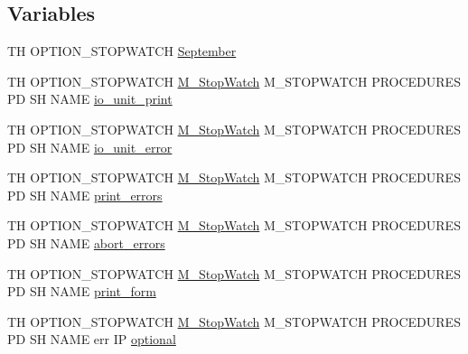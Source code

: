 \subsection*{Variables}
\begin{DoxyCompactItemize}
\item 
TH O\+P\+T\+I\+O\+N\+\_\+\+S\+T\+O\+P\+W\+A\+T\+CH \hyperlink{option__stopwatch_83_8txt_acc3d7c797b4f4947458d4eda2991d70a}{September}
\item 
TH O\+P\+T\+I\+O\+N\+\_\+\+S\+T\+O\+P\+W\+A\+T\+CH \hyperlink{option__stopwatch_83_8txt_aa2011fc45a5e502e87ee50996a8a9305}{M\+\_\+\+Stop\+Watch} M\+\_\+\+S\+T\+O\+P\+W\+A\+T\+CH P\+R\+O\+C\+E\+D\+U\+R\+ES PD SH N\+A\+ME \hyperlink{option__stopwatch_83_8txt_a4fe5427ea57805c6d78b77a54a002e36}{io\+\_\+unit\+\_\+print}
\item 
TH O\+P\+T\+I\+O\+N\+\_\+\+S\+T\+O\+P\+W\+A\+T\+CH \hyperlink{option__stopwatch_83_8txt_aa2011fc45a5e502e87ee50996a8a9305}{M\+\_\+\+Stop\+Watch} M\+\_\+\+S\+T\+O\+P\+W\+A\+T\+CH P\+R\+O\+C\+E\+D\+U\+R\+ES PD SH N\+A\+ME \hyperlink{option__stopwatch_83_8txt_a5921418297454465f26a02b350456a4b}{io\+\_\+unit\+\_\+error}
\item 
TH O\+P\+T\+I\+O\+N\+\_\+\+S\+T\+O\+P\+W\+A\+T\+CH \hyperlink{option__stopwatch_83_8txt_aa2011fc45a5e502e87ee50996a8a9305}{M\+\_\+\+Stop\+Watch} M\+\_\+\+S\+T\+O\+P\+W\+A\+T\+CH P\+R\+O\+C\+E\+D\+U\+R\+ES PD SH N\+A\+ME \hyperlink{option__stopwatch_83_8txt_aac742f39d25b161bfa9ac83be8041e45}{print\+\_\+errors}
\item 
TH O\+P\+T\+I\+O\+N\+\_\+\+S\+T\+O\+P\+W\+A\+T\+CH \hyperlink{option__stopwatch_83_8txt_aa2011fc45a5e502e87ee50996a8a9305}{M\+\_\+\+Stop\+Watch} M\+\_\+\+S\+T\+O\+P\+W\+A\+T\+CH P\+R\+O\+C\+E\+D\+U\+R\+ES PD SH N\+A\+ME \hyperlink{option__stopwatch_83_8txt_aeabdb3b9e9e255861c57d32f767aa203}{abort\+\_\+errors}
\item 
TH O\+P\+T\+I\+O\+N\+\_\+\+S\+T\+O\+P\+W\+A\+T\+CH \hyperlink{option__stopwatch_83_8txt_aa2011fc45a5e502e87ee50996a8a9305}{M\+\_\+\+Stop\+Watch} M\+\_\+\+S\+T\+O\+P\+W\+A\+T\+CH P\+R\+O\+C\+E\+D\+U\+R\+ES PD SH N\+A\+ME \hyperlink{option__stopwatch_83_8txt_a86ad7ca7471d1fef8c045a16cac49a65}{print\+\_\+form}
\item 
TH O\+P\+T\+I\+O\+N\+\_\+\+S\+T\+O\+P\+W\+A\+T\+CH \hyperlink{option__stopwatch_83_8txt_aa2011fc45a5e502e87ee50996a8a9305}{M\+\_\+\+Stop\+Watch} M\+\_\+\+S\+T\+O\+P\+W\+A\+T\+CH P\+R\+O\+C\+E\+D\+U\+R\+ES PD SH N\+A\+ME err IP \hyperlink{option__stopwatch_83_8txt_aa4ece75e7acf58a4843f70fe18c3ade5}{optional}
\item 

\end{DoxyCompactItemize}

